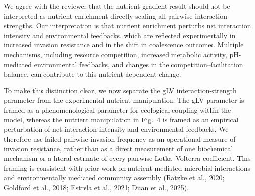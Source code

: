 \responselabel
We agree with the reviewer that the nutrient-gradient result should not be interpreted as nutrient enrichment directly scaling all pairwise interaction strengths. Our interpretation is that nutrient enrichment perturbs net interaction intensity and environmental feedbacks, which are reflected experimentally in increased invasion resistance and in the shift in coalescence outcomes. Multiple mechanisms, including resource competition, increased metabolic activity, pH-mediated environmental feedbacks, and changes in the competition--facilitation balance, can contribute to this nutrient-dependent change.

To make this distinction clear, we now separate the gLV interaction-strength parameter from the experimental nutrient manipulation. The gLV parameter is framed as a phenomenological parameter for ecological coupling within the model, whereas the nutrient manipulation in Fig.~4 is framed as an empirical perturbation of net interaction intensity and environmental feedbacks. We therefore use failed pairwise invasion frequency as an operational measure of invasion resistance, rather than as a direct measurement of one biochemical mechanism or a literal estimate of every pairwise Lotka--Volterra coefficient. This framing is consistent with prior work on nutrient-mediated microbial interactions and environmentally mediated community assembly (Ratzke et al., 2020; Goldford et al., 2018; Estrela et al., 2021; Duan et al., 2025).


